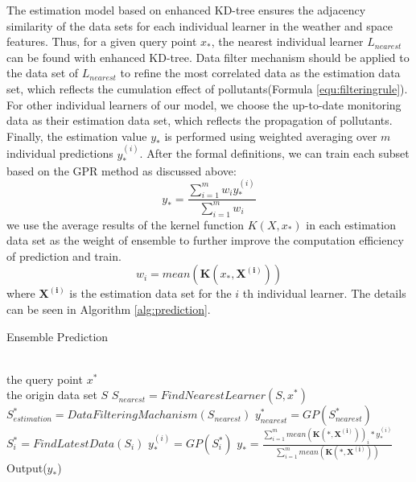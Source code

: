 \documentclass[twoside,leqno,twocolumn]{article}
\begin{document}
The estimation model based on enhanced KD-tree ensures the adjacency similarity of the data sets for each individual learner in the weather and space features. Thus, for a given query point $x_*$, the nearest individual learner $L_{nearest}$ can be found with enhanced KD-tree. Data filter mechanism should be applied to the data set of $L_{nearest}$ to refine the most correlated data as the estimation data set, which reflects the cumulation effect of pollutants(Formula \ref{equ:filteringrule}). For other individual learners of our model, we choose the up-to-date monitoring data as their estimation data set, which reflects the propagation of pollutants. Finally, the estimation value $y_*$ is performed using weighted averaging over $m$ individual predictions $y_*^{(i)}$. After the formal definitions, we can train each subset based on the GPR method as discussed above:
\begin{equation}
y_*=\frac{\sum_{i=1}^mw_iy^{(i)}_*}{\sum_{i=1}^mw_i}
\end{equation}
we use the average results of the kernel function $K(X, x_*)$ in each estimation data set as the weight of ensemble to further improve the computation efficiency of prediction and train.
 \begin{equation}
 w_i =  mean(\bm{K}(x_*,\bm{X^{(i)}}))
 \end{equation}
where $\bm{X^{(i)}}$ is the estimation data set for the $i$ th individual learner. The details can be seen in Algorithm \ref{alg:prediction}.
\begin{algorithm}[htb]
\caption{Ensemble Prediction}
\label{alg:prediction}
\begin{algorithmic}[1]
\REQUIRE ~~\\
the query point $x^*$ \\
the origin data set $S$
\STATE $S_{nearest} = FindNearestLearner(S, x^*)$
\STATE $S_{estimation}^* = DataFilteringMachanism(S_{nearest})$
\STATE $y^*_{nearest} = GP(S_{nearest}^*)$
    \STATE $S_i^* = FindLatestData(S_i)$
    \STATE $y_*^{(i)} = GP(S_i^*)$
\ENDFOR
\STATE $y_*=\frac{\sum_{i=1}^m mean(\bm{K}(*,\bm{X^{(i)}}))_i * y^{(i)}_*}{\sum_{i=1}^m mean(\bm{K}(*,\bm{X^{(i)}}))}$
\STATE Output($y_*$)
\end{algorithmic}
\end{algorithm}
\end{document}
